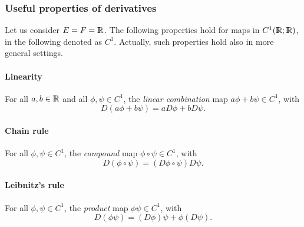 \documentclass{31x47jw}
\begin{document}
\subsubsection{Useful properties of derivatives} 

Let us consider $E = F = \mathbb{I\!\!R}$.  The following properties hold for maps in
$C^{1}(\mathbb{I\!\!R};\mathbb{I\!\!R})$, in the following denoted as $C^{1}$.  Actually, such
properties hold also in more general settings.

\paragraph{Linearity}

For all $a,b\in\mathbb{I\!\!R}$ and all $\phi,\psi\in C^{1}$, the \emph{linear 
combination} map $a
\phi + b \psi \in C^{1}$, with
\[
D(a \phi + b \psi) = a D\phi + b D\psi.
\]

\paragraph{Chain rule}

For all $\phi,\psi\in C^{1}$, the \emph{compound} map $\phi
\circ \psi \in C^{1}$, with
\[
D(\phi \circ \psi) = (D\phi \circ \psi) D\psi.
\]


\paragraph{Leibnitz's rule}

For all $\phi,\psi\in C^{1}$, the \emph{product} map $\phi \psi
\in C^{1}$, with
\[
D(\phi \psi) = (D\phi) \psi + \phi (D\psi).
\]
\end{document}
